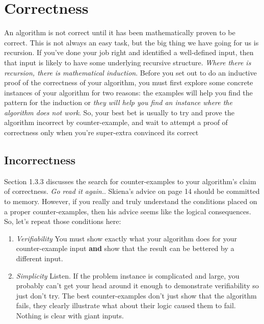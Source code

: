 \documentclass[]{tufte-handout}
\begin{document}
\section{Correctness}

An algorithm is not correct until it has been mathematically proven to be correct.  This is not always an easy task, but the big thing we have going for us is recursion.  If you've done your job right and identified a well-defined input, then that input is likely to have some underlying recursive structure. \textit{Where there is recursion, there is mathematical induction}.  Before you set out to do an inductive proof of the correctness of your algorithm, you must first explore some concrete instances of your algorithm for two reasons: the examples will help you find the pattern for the induction or \textit{they will help you find an instance where the algorithm does not work}.  So, your best bet is usually to try and prove the algorithm incorrect by counter-example, and wait to attempt a proof of correctness only when you're super-extra convinced its correct

\subsection{Incorrectness}

Section 1.3.3 discusses the search for counter-examples to your algorithm's claim of correctness.  \textit{Go read it again.}. Skiena's advice on page 14 should be committed to memory.  However, if you really and truly understand the conditions placed on a proper counter-examples, then his advice seems like the logical consequences. So, let's repeat those conditions here:
\begin{enumerate}
\item \textit{Verifiability} You must show exactly what your algorithm does for your counter-example input \textbf{and} show that the result can be bettered by a different input.

\item \textit{Simplicity} Listen. If the problem instance is complicated and large, you probably can't get your head around it enough to demonstrate verifiability so just don't try. The best counter-examples don't just show that the algorithm fails, they clearly illustrate what about their logic caused them to fail. Nothing is clear with giant inputs. 
\end{enumerate}
\end{document}
